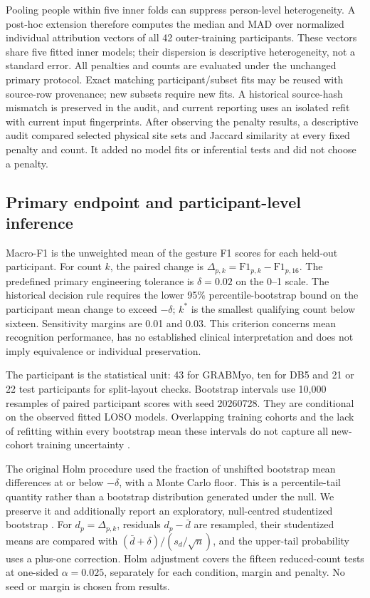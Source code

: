 Pooling people within five inner folds can suppress person-level heterogeneity. A post-hoc extension therefore computes the median and MAD over normalized individual attribution vectors of all 42 outer-training participants. These vectors share five fitted inner models; their dispersion is descriptive heterogeneity, not a standard error. All penalties and counts are evaluated under the unchanged primary protocol. Exact matching participant/subset fits may be reused with source-row provenance; new subsets require new fits. A historical source-hash mismatch is preserved in the audit, and current reporting uses an isolated refit with current input fingerprints. After observing the penalty results, a descriptive audit compared selected physical site sets and Jaccard similarity at every fixed penalty and count. It added no model fits or inferential tests and did not choose a penalty.

\subsection{Primary endpoint and participant-level inference}
Macro-F1 is the unweighted mean of the gesture F1 scores for each held-out participant. For count $k$, the paired change is $\Delta_{p,k}=\mathrm{F1}_{p,k}-\mathrm{F1}_{p,16}$. The predefined primary engineering tolerance is $\delta=0.02$ on the 0--1 scale. The historical decision rule requires the lower 95\% percentile-bootstrap bound on the participant mean change to exceed $-\delta$; $k^*$ is the smallest qualifying count below sixteen. Sensitivity margins are 0.01 and 0.03. This criterion concerns mean recognition performance, has no established clinical interpretation and does not imply equivalence or individual preservation.

The participant is the statistical unit: 43 for GRABMyo, ten for DB5 and 21 or 22 test participants for split-layout checks. Bootstrap intervals use 10,000 resamples of paired participant scores with seed 20260728. They are conditional on the observed fitted LOSO models. Overlapping training cohorts and the lack of refitting within every bootstrap mean these intervals do not capture all new-cohort training uncertainty \citep{bengio2004variance}.

The original Holm procedure used the fraction of unshifted bootstrap mean differences at or below $-\delta$, with a Monte Carlo floor. This is a percentile-tail quantity rather than a bootstrap distribution generated under the null. We preserve it and additionally report an exploratory, null-centred studentized bootstrap \citep{davison1997bootstrap}. For $d_p=\Delta_{p,k}$, residuals $d_p-\bar d$ are resampled, their studentized means are compared with $(\bar d+\delta)/(s_d/\sqrt n)$, and the upper-tail probability uses a plus-one correction. Holm adjustment covers the fifteen reduced-count tests at one-sided $\alpha=0.025$, separately for each condition, margin and penalty. No seed or margin is chosen from results.


